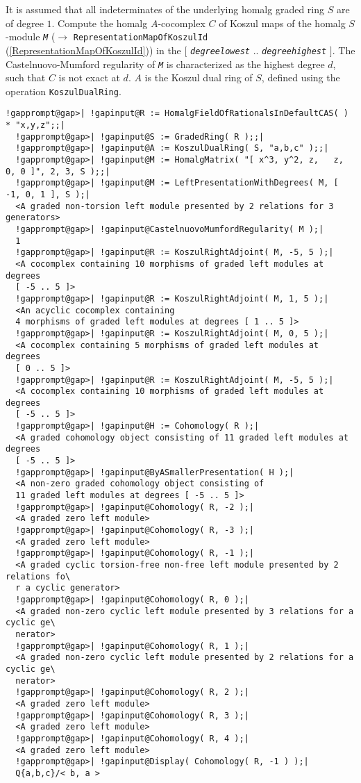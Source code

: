 \documentclass[a4paper,11pt]{report}
\begin{document}
{{{ It is assumed that all indeterminates of the underlying \textsf{homalg} graded ring $S$ are of degree $1$. Compute the \textsf{homalg} $A$-cocomplex $C$ of Koszul maps of the \textsf{homalg} $S$-module \mbox{\texttt{\mdseries\slshape M}} ($\to$ \texttt{RepresentationMapOfKoszulId} (\ref{RepresentationMapOfKoszulId})) in the $[$ \mbox{\texttt{\mdseries\slshape degree{\textunderscore}lowest}} .. \mbox{\texttt{\mdseries\slshape degree{\textunderscore}highest}} $]$. The Castelnuovo-Mumford regularity of \mbox{\texttt{\mdseries\slshape M}} is characterized as the highest degree $d$, such that $C$ is not exact at $d$. $A$ is the Koszul dual ring of $S$, defined using the operation \texttt{KoszulDualRing}. 
\begin{Verbatim}[commandchars=!@|,fontsize=\small,frame=single,label=Example]
  !gapprompt@gap>| !gapinput@R := HomalgFieldOfRationalsInDefaultCAS( ) * "x,y,z";;|
  !gapprompt@gap>| !gapinput@S := GradedRing( R );;|
  !gapprompt@gap>| !gapinput@A := KoszulDualRing( S, "a,b,c" );;|
  !gapprompt@gap>| !gapinput@M := HomalgMatrix( "[ x^3, y^2, z,   z, 0, 0 ]", 2, 3, S );;|
  !gapprompt@gap>| !gapinput@M := LeftPresentationWithDegrees( M, [ -1, 0, 1 ], S );|
  <A graded non-torsion left module presented by 2 relations for 3 generators>
  !gapprompt@gap>| !gapinput@CastelnuovoMumfordRegularity( M );|
  1
  !gapprompt@gap>| !gapinput@R := KoszulRightAdjoint( M, -5, 5 );|
  <A cocomplex containing 10 morphisms of graded left modules at degrees
  [ -5 .. 5 ]>
  !gapprompt@gap>| !gapinput@R := KoszulRightAdjoint( M, 1, 5 );|
  <An acyclic cocomplex containing
  4 morphisms of graded left modules at degrees [ 1 .. 5 ]>
  !gapprompt@gap>| !gapinput@R := KoszulRightAdjoint( M, 0, 5 );|
  <A cocomplex containing 5 morphisms of graded left modules at degrees
  [ 0 .. 5 ]>
  !gapprompt@gap>| !gapinput@R := KoszulRightAdjoint( M, -5, 5 );|
  <A cocomplex containing 10 morphisms of graded left modules at degrees
  [ -5 .. 5 ]>
  !gapprompt@gap>| !gapinput@H := Cohomology( R );|
  <A graded cohomology object consisting of 11 graded left modules at degrees 
  [ -5 .. 5 ]>
  !gapprompt@gap>| !gapinput@ByASmallerPresentation( H );|
  <A non-zero graded cohomology object consisting of
  11 graded left modules at degrees [ -5 .. 5 ]>
  !gapprompt@gap>| !gapinput@Cohomology( R, -2 );|
  <A graded zero left module>
  !gapprompt@gap>| !gapinput@Cohomology( R, -3 );|
  <A graded zero left module>
  !gapprompt@gap>| !gapinput@Cohomology( R, -1 );|
  <A graded cyclic torsion-free non-free left module presented by 2 relations fo\
  r a cyclic generator>
  !gapprompt@gap>| !gapinput@Cohomology( R, 0 );|
  <A graded non-zero cyclic left module presented by 3 relations for a cyclic ge\
  nerator>
  !gapprompt@gap>| !gapinput@Cohomology( R, 1 );|
  <A graded non-zero cyclic left module presented by 2 relations for a cyclic ge\
  nerator>
  !gapprompt@gap>| !gapinput@Cohomology( R, 2 );|
  <A graded zero left module>
  !gapprompt@gap>| !gapinput@Cohomology( R, 3 );|
  <A graded zero left module>
  !gapprompt@gap>| !gapinput@Cohomology( R, 4 );|
  <A graded zero left module>
  !gapprompt@gap>| !gapinput@Display( Cohomology( R, -1 ) );|
  Q{a,b,c}/< b, a >
  

\end{Verbatim}}}}
\end{document}
